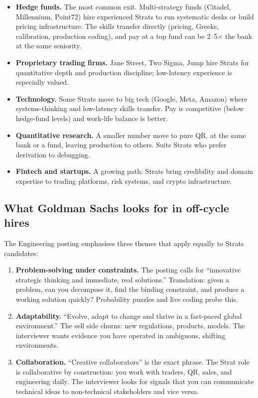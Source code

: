 \begin{itemize}
  \item \textbf{Hedge funds.} The most common exit.  Multi-strategy
    funds (Citadel, Millennium, Point72) hire experienced Strats to
    run systematic desks or build pricing infrastructure.  The
    skills transfer directly (pricing, Greeks, calibration,
    production coding), and pay at a top fund can be 2--5$\times$
    the bank at the same seniority.
  \item \textbf{Proprietary trading firms.} Jane Street, Two Sigma,
    Jump hire Strats for quantitative depth and production
    discipline; low-latency experience is especially valued.
  \item \textbf{Technology.} Some Strats move to big tech (Google,
    Meta, Amazon) where systems-thinking and low-latency skills
    transfer.  Pay is competitive (below hedge-fund levels) and
    work-life balance is better.
  \item \textbf{Quantitative research.} A smaller number move to
    pure QR, at the same bank or a fund, leaving production to
    others.  Suits Strats who prefer derivation to debugging.
  \item \textbf{Fintech and startups.}  A growing path: Strats bring
    credibility and domain expertise to trading platforms, risk
    systems, and crypto infrastructure.
\end{itemize}

\subsection{What Goldman Sachs looks for in off-cycle hires}

The Engineering posting emphasises three themes that apply equally
to Strats candidates:

\begin{enumerate}
  \item \textbf{Problem-solving under constraints.}  The posting
    calls for ``innovative strategic thinking and immediate, real
    solutions.''  Translation: given a problem, can you decompose
    it, find the binding constraint, and produce a working solution
    quickly?  Probability puzzles and live coding probe this.
  \item \textbf{Adaptability.}  ``Evolve, adapt to change and thrive
    in a fast-paced global environment.''  The sell side churns:
    new regulations, products, models.  The interviewer wants
    evidence you have operated in ambiguous, shifting environments.
  \item \textbf{Collaboration.}  ``Creative collaborators'' is the
    exact phrase.  The Strat role is collaborative by construction:
    you work with traders, QR, sales, and engineering daily.
    The interviewer looks for signals that you can communicate
    technical ideas to non-technical stakeholders and vice versa.
\end{enumerate}

